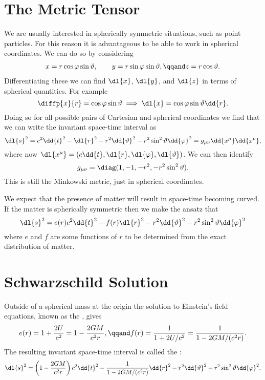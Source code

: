 \documentclass[fleqn]{NotesClass}
\begin{document}
    \section{The Metric Tensor}
    We are usually interested in spherically symmetric situations, such as point particles.
    For this reason it is advantageous to be able to work in spherical coordinates.
    We can do so by considering
    \begin{align}
        x = r\cos\varphi\sin\vartheta, \qquad y = r\sin\varphi\sin\vartheta, \qqand z = r\cos\vartheta.
    \end{align}
    Differentiating these we can find \(\dl{x}\), \(\dl{y}\), and \(\dl{z}\) in terms of spherical quantities.
    For example
    \begin{equation}
        \diffp{x}{r} = \cos\varphi\sin\vartheta \implies \dl{x} = \cos\varphi\sin\vartheta\dd{r}.
    \end{equation}
    Doing so for all possible pairs of Cartesian and spherical coordinates we find that we can write the invariant space-time interval as
    \begin{equation}
        \dl{s}^2 = c^2\dd{t}^2 - \dl{r}^2 - r^2 \dd{\vartheta}^2 - r^2 \sin^2 \vartheta \dd{\varphi}^2 = g_{\mu\nu}\dd{x^\mu}\dd{x^\nu},
    \end{equation}
    where now \(\dl{x^\mu} = (c\dd{t}, \dl{r}, \dl{\varphi}, \dl{\vartheta})\).
    We can then identify
    \begin{equation}
        g_{\mu\nu} = \diag(1, -1, -r^2, -r^2\sin^2\vartheta).
    \end{equation}
    This is still the Minkowski metric, just in spherical coordinates.
    
    We expect that the presence of matter will result in space-time becoming curved.
    If the matter is spherically symmetric then we make the ansatz that
    \begin{equation}
        \dl{s}^2 = e(r)c^2\dd{t}^2 - f(r)\dl{r}^2 - r^2 \dd{\vartheta}^2 - r^2 \sin^2 \vartheta \dd{\varphi}^2
    \end{equation}
    where \(e\) and \(f\) are some functions of \(r\) to be determined from the exact distribution of matter.
    
    \section{Schwarzschild Solution}
    Outside of a spherical mass at the origin the solution to Einstein's field equations, known as the , gives
    \begin{equation}
        e(r) = 1 + \frac{2U}{c^2} = 1 - \frac{2GM}{c^2r}, \qqand f(r) = \frac{1}{1 + 2U/c^2} = \frac{1}{1 - 2GM/(c^2r)}.
    \end{equation}
    The resulting invariant space-time interval is called the :
    \begin{equation}
        \dl{s}^2 = \left( 1 - \frac{2GM}{c^2r} \right)c^2\dd{t}^2 - \frac{1}{1 - 2GM/(c^2r)}\dd{r}^2 - r^2\dd{\vartheta}^2 - r^2 \sin^2\vartheta \dd{\varphi}^2.
    \end{equation}
    
\end{document}
